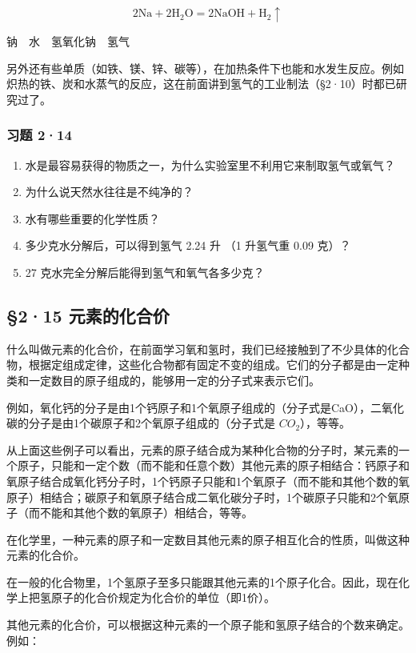 \[
2 \mathrm{Na} + 2 \mathrm{H}_{2} \mathrm{O} = 2 \mathrm{NaOH} + \mathrm{H}_{2} \uparrow
\]

钠　水　氢氧化钠　氢气

另外还有些单质（如铁、镁、锌、碳等），在加热条件下也能和水发生反应。例如炽热的铁、炭和水蒸气的反应，这在前面讲到氢气的工业制法（§2·10）时都已研究过了。

\subsubsection{习题 2·14}

\begin{enumerate}
\item
  水是最容易获得的物质之一，为什么实验室里不利用它来制取氢气或氧气？
\item
  为什么说天然水往往是不纯净的？
\item
  水有哪些重要的化学性质？
\item
  多少克水分解后，可以得到氢气 2.24 升 （1 升氢气重 0.09 克）？
\item
  27 克水完全分解后能得到氢气和氧气各多少克？
\end{enumerate}

\subsection{§2·15 元素的化合价}

什么叫做元素的化合价，在前面学习氧和氢时，我们已经接触到了不少具体的化合物，根据定组成定律，这些化合物都有固定不变的组成。它们的分子都是由一定种类和一定数目的原子组成的，能够用一定的分子式来表示它们。

例如，氧化钙的分子是由1个钙原子和1个氧原子组成的（分子式是CaO），二氧化碳的分子是由1个碳原子和2个氧原子组成的（分子式是
\(CO_{2}\)），等等。

从上面这些例子可以看出，元素的原子结合成为某种化合物的分子时，某元素的一个原子，只能和一定个数（而不能和任意个数）其他元素的原子相结合：钙原子和氧原子结合成氧化钙分子时，1个钙原子只能和1个氧原子（而不能和其他个数的氧原子）相结合；碳原子和氧原子结合成二氧化碳分子时，1个碳原子只能和2个氧原子（而不能和其他个数的氧原子）相结合，等等。

在化学里，一种元素的原子和一定数目其他元素的原子相互化合的性质，叫做这种元素的化合价。

在一般的化合物里，1个氢原子至多只能跟其他元素的1个原子化合。因此，现在化学上把氢原子的化合价规定为化合价的单位（即1价）。

其他元素的化合价，可以根据这种元素的一个原子能和氢原子结合的个数来确定。例如：

